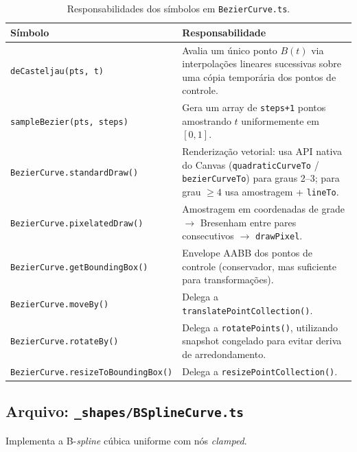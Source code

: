 \documentclass[12pt, a4paper]{article}
\theoremstyle{remark}
\newcommand{\file}[1]{\texttt{\small #1}}
\newcommand{\code}[1]{\texttt{#1}}
\begin{document}
\begin{table}[H]
\centering
\begin{tabular}{lp{9.5cm}}
\toprule
\textbf{Símbolo} & \textbf{Responsabilidade} \\
\midrule
\code{deCasteljau(pts, t)} & Avalia um único ponto $B(t)$ via interpolações lineares
                             sucessivas sobre uma cópia temporária dos pontos de controle. \\
\code{sampleBezier(pts, steps)} & Gera um array de \code{steps+1} pontos amostrando
                                   $t$ uniformemente em $[0, 1]$. \\
\code{BezierCurve.standardDraw()} & Renderização vetorial: usa API nativa do Canvas
                                    (\code{quadraticCurveTo} / \code{bezierCurveTo}) para
                                    graus 2–3; para grau $\geq 4$ usa amostragem + \code{lineTo}. \\
\code{BezierCurve.pixelatedDraw()} & Amostragem em coordenadas de grade $\to$
                                     Bresenham entre pares consecutivos $\to$
                                     \code{drawPixel}. \\
\code{BezierCurve.getBoundingBox()} & Envelope AABB dos pontos de controle
                                      (conservador, mas suficiente para transformações). \\
\code{BezierCurve.moveBy()} & Delega a \code{translatePointCollection()}. \\
\code{BezierCurve.rotateBy()} & Delega a \code{rotatePoints()}, utilizando
                                 snapshot congelado para evitar deriva de arredondamento. \\
\code{BezierCurve.resizeToBoundingBox()} & Delega a \code{resizePointCollection()}. \\
\bottomrule
\end{tabular}
\caption{Responsabilidades dos símbolos em \file{BezierCurve.ts}.}
\end{table}

\subsection{Arquivo: \file{\_shapes/BSplineCurve.ts}}

Implementa a B-\emph{spline} cúbica uniforme com nós \emph{clamped}.
\end{document}
